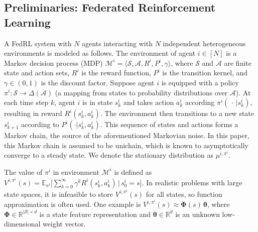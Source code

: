 \documentclass{article} %
\theoremstyle{plain}
\theoremstyle{definition}
\theoremstyle{remark}
\newcommand{\cB}{\mathcal{B}}
\newcommand{\cA}{\mathcal{A}}
\newcommand{\cS}{\mathcal{S}}
\newcommand{\cC}{\mathcal{C}}
\newcommand{\cD}{\mathcal{D}}
\newcommand{\cN}{\mathcal{N}}
\newcommand{\cM}{\mathcal{M}}
\def\cA{{\mathcal{A}}} \def\cB{{\mathcal{B}}} \def\cC{{\mathcal{C}}} \def\cD{{\mathcal{D}}}
\def\cM{{\mathcal{M}}} \def\cN{{\mathcal{N}}} \def\cO{{\mathcal{O}}} \def\cP{{\mathcal{P}}}
\begin{document}
\subsection{Preliminaries: Federated Reinforcement Learning}\label{sec:fedrl}
A FedRL system with $N$ agents interacting with $N$ independent heterogeneous environments is modeled as follows. The environment of agent $i \in [N]$ is a Markov decision process (MDP) $\cM^i=\langle \cS, \cA, R^i, P^i, \gamma\rangle$, where $\cS$ and $\cA$ are finite state and action sets, $R^i$ is the reward function, $P^i$ is the transition kernel, and $\gamma\in(0,1)$ is the discount factor. Suppose agent $i$ is equipped with a policy $\pi^i: \mathcal S \rightarrow \Delta(\mathcal A)$ (a mapping from states to probability distributions over $\mathcal A$). At each time step $k$, agent $i$ is in state $s^i_k$ and takes action $a^i_k$ according $\pi^i(\,\cdot\,|s^i_k)$, resulting in reward $R^i(s^i_k, a^i_k)$. The environment then transitions to a new state $s^i_{k+1}$ according to $P^i(\cdot|s^i_k, a^i_k)$. This sequence of states and actions forms a Markov chain, the source of the aforementioned Markovian noise. In this paper, this Markov chain is assumed to be unichain, which is known to asymptotically converge to a steady state. We denote the stationary distribution as $\mu^{i, \pi^i}$. 

The value of $\pi^i$ in environment $\cM^i$ is defined as $V^{i, \pi^i}(s)=\mathbb{E}_{\pi^i}\bigl[\sum_{k=0}^\infty \gamma^k R^i(s^i_k,a^i_k)\,|\,s^i_0=s\bigr]$.
In realistic problems with large state spaces, it is infeasible to store $V^{i,\pi^i}(s)$ for all states, so function approximation is often used. One example is $V^{i,\pi^i}(s) \approx \pmb{\Phi}(s) \, \pmb{\theta}$, where $\pmb{\Phi}\in\mathbb{R}^{|\cS|\times d}$ is a state feature representation and $\pmb{\theta}\in\mathbb{R}^d$ is an unknown low-dimensional weight vector. 
\end{document}
